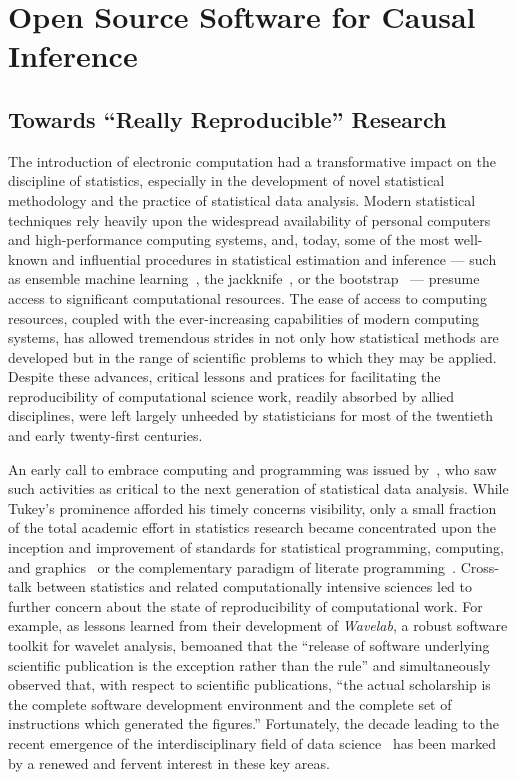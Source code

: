 \chapter{Open Source Software for Causal Inference}\label{five}

\section{Towards ``Really Reproducible'' Research}

The introduction of electronic computation had a transformative impact on the
discipline of statistics, especially in the development of novel statistical
methodology and the practice of statistical data analysis. Modern statistical
techniques rely heavily upon the widespread availability of personal computers
and high-performance computing systems, and, today, some of the most well-known
and influential procedures in statistical estimation and inference --- such as
ensemble machine learning~\citep{vdl2007super}, the
jackknife~\citep{efron1981nonparametric}, or the
bootstrap~\citep{efron1981nonparametric, efron1994introduction,
davison1997bootstrap} --- presume access to significant computational resources.
The ease of access to computing resources, coupled with the ever-increasing
capabilities of modern computing systems, has allowed tremendous strides in not
only how statistical methods are developed but in the range of scientific
problems to which they may be applied. Despite these advances, critical lessons
and pratices for facilitating the reproducibility of computational science work,
readily absorbed by allied disciplines, were left largely unheeded by
statisticians for most of the twentieth and early twenty-first centuries.

An early call to embrace computing and programming was issued
by~\citet{tukey1962future}, who saw such activities as critical to the next
generation of statistical data analysis. While Tukey's prominence afforded his
timely concerns visibility, only a small fraction of the total academic effort
in statistics research became concentrated upon the inception and improvement of
standards for statistical programming, computing, and
graphics~\citep{becker1984s, becker1988new, ihaka1996r} or the complementary
paradigm of literate programming~\citep{knuth1984literate}. Cross-talk between
statistics and related computationally intensive sciences led to further concern
about the state of reproducibility of computational work. For example, as
lessons learned from their development of \textit{Wavelab}, a robust software
toolkit for wavelet analysis, \citet{buckheit1995wavelab} bemoaned that the
``release of software underlying scientific publication is the exception rather
than the rule'' and simultaneously observed that, with respect to scientific
publications, ``the actual scholarship is the complete software development
environment and the complete set of instructions which generated the figures.''
Fortunately, the decade leading to the recent emergence of the interdisciplinary
field of data science~\citep{donoho2017fifty} has been marked by a renewed and
fervent interest in these key areas.

